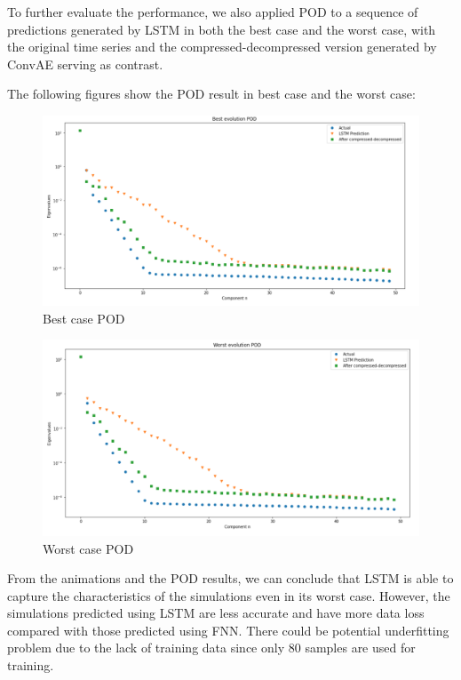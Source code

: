 To further evaluate the performance, we also applied POD to a sequence of predictions generated by LSTM in both the best case and the worst case, with the original time series and the compressed-decompressed version generated by ConvAE serving as contrast.

The following figures show the POD result in best case and the worst case:

\begin{figure}[H]
    \caption{Best case POD}
    \includegraphics[scale=0.5]{Report LaTeX/figures/mantle_convection_images/limited_dataset/LSTM_Best_POD.png}
\end{figure}

\begin{figure}[H]
    \caption{Worst case POD}
    \includegraphics[scale=0.5]{Report LaTeX/figures/mantle_convection_images/limited_dataset/LSTM_Worst_POD.png}
\end{figure}

From the animations and the POD results, we can conclude that LSTM is able to capture the characteristics of the simulations even in its worst case. However, the simulations predicted using LSTM are less accurate and have more data loss compared with those predicted using FNN. There could be potential underfitting problem due to the lack of training data since only 80 samples are used for training.


